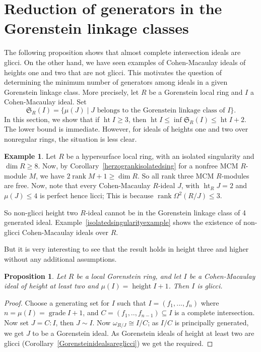 \documentclass[11pt,letterpaper]{amsart}
\newcommand{\seq}{\subseteq}
\DeclareMathOperator{\gr}{grade}
\DeclareMathOperator{\rank}{rank}
\DeclareMathOperator{\height}{height}
\theoremstyle{plain}
\newtheorem{prop}[thm]{Proposition}
\theoremstyle{definition}
\newtheorem{ex}[thm]{Example}
\theoremstyle{remark}
\begin{document}
\section{Reduction of generators in the Gorenstein linkage classes}

The following proposition shows that almost complete
intersection ideals are glicci. On the other hand, we
have seen examples of Cohen-Macaulay ideals of heights
one and two that are not glicci. This motivates the
question of determining the minimum number of generators
among ideals in a given Gorenstein linkage class.
More precisely, let $R$ be a Gorenstein local ring
and $I$ a Cohen-Macaulay ideal. Set
\[
\mathfrak{S}_R(I)=
\{\mu(J)\mid J \text{ belongs to the Gorenstein
linkage class of } I\}.
\]
In this section, we show that if $\operatorname{ht} I\geq 3$,
then $\operatorname{ht} I\leq\inf\mathfrak{S}_R(I)
\leq\operatorname{ht} I+2$. The lower bound is immediate. However, for ideals of
heights one and two over nonregular rings, the
situation is less clear.

\begin{ex}
    Let $R$ be a hypersurface local ring, with an isolated singularity and $\dim R\ge 8$. Now, by Corollary~\ref{herzogrankisolatedsing} for a nonfree MCM $R$-module $M$, we have $2\rank M+1\ge\dim R$. So all rank three MCM $R$-modules are free. Now, note that every Cohen-Macaulay $R$-ideal $J$, with $\operatorname{ht}_RJ=2$ and $\mu(J)\le 4$ is perfect hence licci; This is because $\rank\Omega^2(R/J)\le 3$. 

    So non-glicci height two $R$-ideal cannot be in the Gorenstein linkage class of 4 generated ideal. Example~\ref{isolatedsingularityexample} shows the existence of non-glicci Cohen-Macaulay ideals over $R$. 
\end{ex}

But it is very interesting to see that the result holds in height three and higher without any additional assumptions. 

\begin{prop}
    Let $R$ be a local Gorenstein ring, and let $I$ be a Cohen-Macaulay ideal of height at least two and $\mu(I)=\height I+1$. Then $I$ is glicci.  
\end{prop}
\begin{proof}
    Choose a generating set for $I$ such that $I=(f_1,...,f_n)$ where $n=\mu(I)=\gr I+1$, and $C=(f_1,..,f_{n-1})\seq I$ is a complete intersection. Now set $J=C:I$, then $J\sim I$. Now $\omega_{R/J}\cong I/C$; as $I/C$ is principally generated, we get $J$ to be a Gorenstein ideal. As Gorenstein ideals of height at least two are glicci (Corollary~\ref{Gorensteinidealsareglicci}) we get the required. 
\end{proof}
\end{document}
